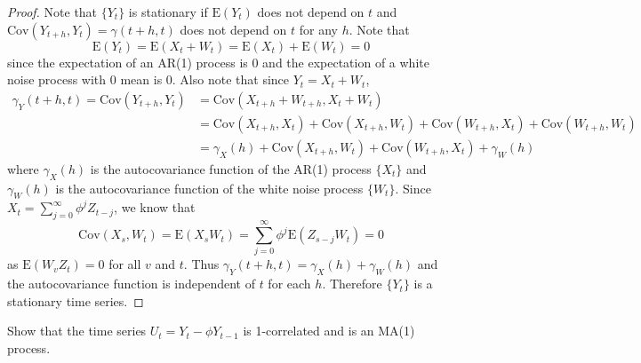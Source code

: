 \documentclass[12pt]{article}
\theoremstyle{definition}
\newenvironment{custompbm}[1]
  {\renewcommand\theproblem{#1}\problem}
  {\endproblem}
\newcommand{\E}{\text{E}}
\newcommand{\Co}[2]{\text{Cov}\left({#1}, {#2}\right)}
\begin{document}
\begin{proof}
  Note that $\{Y_t\}$ is stationary if $\E(Y_t)$ does not depend on $t$ and
  $\Co{Y_{t+h}}{Y_t} = \gamma(t+h,t)$ does not depend on $t$ for any $h$. Note that
  \[
    \E(Y_t) = \E(X_t + W_t) = \E(X_t) + \E(W_t) = 0
  \]
  since the expectation of an AR(1) process is 0 and the expectation of a white
  noise process with 0 mean is 0. Also note that since $Y_t = X_t + W_t$,
  \begin{align*}
    \gamma_Y(t+h,t) = \Co{Y_{t+h}}{Y_t} &= \Co{X_{t+h} + W_{t+h}}{X_t + W_t}\\
    &= \Co{X_{t+h}}{X_t} + \Co{X_{t+h}}{W_t} + \Co{W_{t+h}}{X_t} + \Co{W_{t+h}}{W_t}\\
    &= \gamma_X(h) + \Co{X_{t+h}}{W_t} + \Co{W_{t+h}}{X_t} + \gamma_W(h)
  \end{align*}
  where $\gamma_X(h)$ is the autocovariance function of the AR(1) process $\{X_t\}$
  and $\gamma_W(h)$ is the autocovariance function of the white noise process $\{W_t\}$.
  Since $X_t = \sum_{j=0}^{\infty}\phi^{j}Z_{t-j}$, we know that
  \[
    \Co{X_{s}}{W_t} = \E(X_{s}W_t) = \sum_{j=0}^\infty\phi^j\E(Z_{s-j}W_t) = 0
  \]
  as $\E(W_vZ_t) = 0$ for all $v$ and $t$. Thus $\gamma_Y(t+h,t) = \gamma_X(h) + \gamma_W(h)$
  and the autocovariance function is independent of $t$ for each $h$. Therefore
  $\{Y_t\}$ is a stationary time series.
\end{proof}


\begin{custompbm}{3.b}
  Show that the time series $U_t = Y_t - \phi Y_{t-1}$ is 1-correlated and is an MA(1) process.
\end{custompbm}
\end{document}
